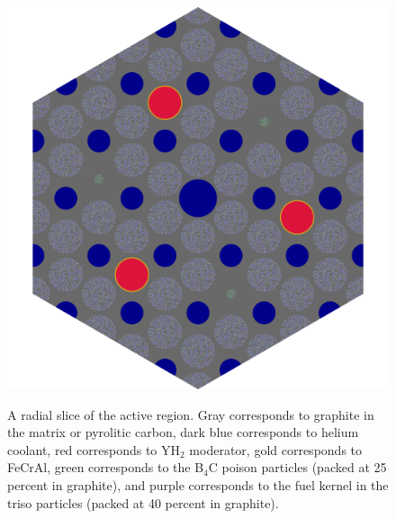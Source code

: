 \documentclass[letterpaper]{physor2024}
\begin{document}
\begin{figure}[!h]
    \centering
    \includegraphics[width=0.375\linewidth]{figures/active_height.png}
    \label{fig:active_slice}
    \caption{A radial slice of the active region. Gray corresponds to graphite in the matrix or pyrolitic carbon, dark blue corresponds to helium coolant, red corresponds to YH$_{2}$ moderator, gold corresponds to FeCrAl, green corresponds to the B$_{4}$C poison particles (packed at 25 percent in graphite), and purple corresponds to the fuel kernel in the \gls{triso} particles (packed at 40 percent in graphite).}
    \label{fig:core_slice_sbs}
\end{figure}
\end{document}
